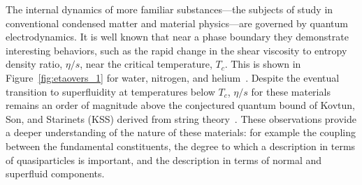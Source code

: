 The internal dynamics of more familiar substances---the subjects of
study in conventional condensed matter and material physics---are
governed by quantum electrodynamics.  It is well known that near a
phase boundary they demonstrate interesting behaviors, such as the
rapid change in the shear viscosity to entropy density ratio,
$\eta/s$, near the critical temperature, $T_c$. This is shown in
Figure~\ref{fig:etaovers_1} for water, nitrogen, and
helium~\cite{Csernai:2006zz}.  Despite the eventual transition to
superfluidity at temperatures below $T_{c}$, $\eta/s$ for these
materials remains an order of magnitude above the conjectured quantum
bound of Kovtun, Son, and Starinets (KSS) derived from string
theory~\cite{Kovtun:2004de}.  These observations provide a deeper
understanding of the nature of these materials: for example the
coupling between the fundamental constituents, the degree to which a
description in terms of quasiparticles is important, and the
description in terms of normal and superfluid components.

